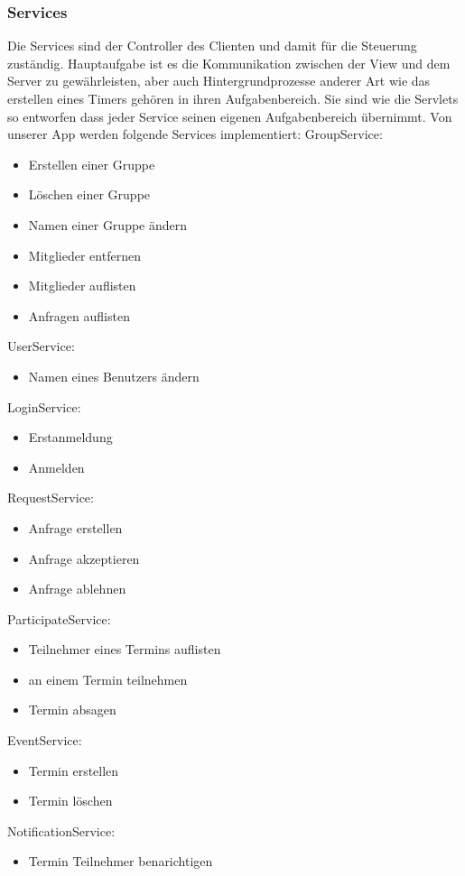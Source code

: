 	\subsubsection{Services}
	Die Services sind der Controller des Clienten und damit für die Steuerung zuständig. Hauptaufgabe ist es die Kommunikation zwischen der View und dem Server zu gewährleisten, aber auch Hintergrundprozesse anderer Art wie das erstellen eines Timers gehören in ihren Aufgabenbereich.
Sie sind wie die Servlets so entworfen dass jeder Service seinen eigenen Aufgabenbereich übernimmt.
Von unserer App werden folgende Services implementiert:
\newline
GroupService:
\begin{itemize}
\item Erstellen einer Gruppe
\item Löschen einer Gruppe
\item Namen einer Gruppe ändern
\item Mitglieder entfernen
\item Mitglieder auflisten
\item Anfragen auflisten
\end{itemize}
UserService:
\begin{itemize}
\item Namen eines Benutzers ändern
\end{itemize}
LoginService:
\begin{itemize}
\item Erstanmeldung
\item Anmelden
\end{itemize}
RequestService:
\begin{itemize}
\item Anfrage erstellen
\item Anfrage akzeptieren
\item Anfrage ablehnen
\end{itemize}
ParticipateService:
\begin{itemize}
\item Teilnehmer eines Termins auflisten
\item an einem Termin teilnehmen
\item Termin absagen
\end{itemize}
EventService:
\begin{itemize}
\item Termin erstellen
\item Termin löschen
\end{itemize}
NotificationService:
\begin{itemize}
\item Termin Teilnehmer benarichtigen
\end{itemize}
